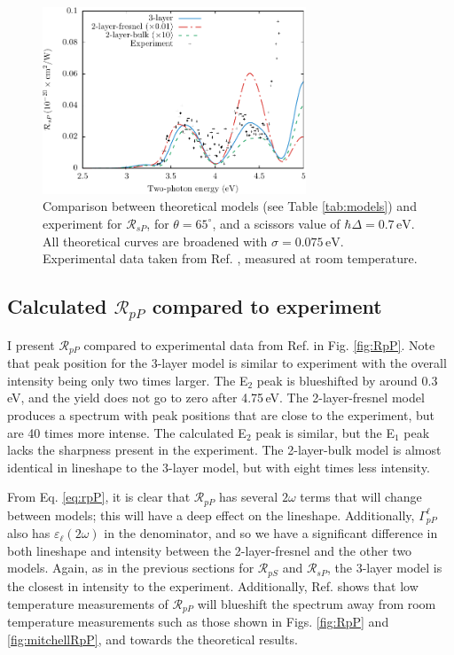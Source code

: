 \begin{figure}
\centering
\includegraphics[width=0.7\textwidth]{figures/fig-4_4_04}
\caption{Comparison between theoretical models (see Table \ref{tab:models}) and
experiment for $\mathcal{R}_{sP}$, for $\theta=65^{\circ}$, and a scissors
value of $\hbar\Delta = 0.7\,\text{eV}$. All theoretical curves are broadened
with $\sigma=0.075\,\text{eV}$. Experimental data taken from Ref.
\cite{mejiaPRB02}, measured at room temperature.}
\label{fig:RsP}
\end{figure}



\subsection{Calculated \texorpdfstring{$\mathcal{R}_{pP}$}{RpP} compared to
experiment}\label{sec:RpP}

I present $\mathcal{R}_{pP}$ compared to experimental data from Ref.
\cite{mejiaPRB02} in Fig. \ref{fig:RpP}. Note that peak position for the 3-layer
model is similar to experiment with the overall intensity being only two times
larger. The E$_{2}$ peak is blueshifted by around 0.3\,eV, and the yield does
not go to zero after 4.75\,eV. The 2-layer-fresnel model produces a spectrum
with peak positions that are close to the experiment, but are 40 times more
intense. The calculated E$_{2}$ peak is similar, but the E$_{1}$ peak lacks the
sharpness present in the experiment. The 2-layer-bulk model is almost identical
in lineshape to the 3-layer model, but with eight times less intensity.

From Eq. \eqref{eq:rpP}, it is clear that $\mathcal{R}_{pP}$ has several
$2\omega$ terms that will change between models; this will have a deep effect on
the lineshape. Additionally, $\Gamma^{\ell}_{pP}$ also has
$\varepsilon_{\ell}(2\omega)$ in the denominator, and so we have a significant
difference in both lineshape and intensity between the 2-layer-fresnel and the
other two models. Again, as in the previous sections for $\mathcal{R}_{pS}$ and
$\mathcal{R}_{sP}$, the 3-layer model is the closest in intensity to the
experiment. Additionally, Ref. \cite{dadapPRB97} shows that low temperature
measurements of $\mathcal{R}_{pP}$ will blueshift the spectrum away from room
temperature measurements such as those shown in Figs. \ref{fig:RpP} and
\ref{fig:mitchellRpP}, and towards the theoretical results.

